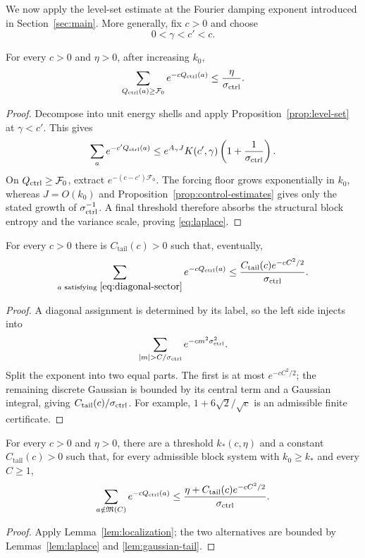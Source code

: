 We now apply the level-set estimate at the Fourier damping exponent introduced
in Section~\ref{sec:main}.  More generally, fix $c>0$ and choose
\begin{equation}\label{eq:gamma-order}
 0<\gamma<c'<c.
\end{equation}

\begin{lemma}\label{lem:laplace}
For every $c>0$ and $\eta>0$, after increasing $k_0$,
\begin{equation}\label{eq:laplace}
 \sum_{Q_{\mathrm{ctrl}}(a)\ge\mathcal F_0}e^{-cQ_{\mathrm{ctrl}}(a)}
 \le\frac\eta{\sigma_{\mathrm{ctrl}}}.
\end{equation}
\end{lemma}
\begin{proof}
Decompose into unit energy shells and apply Proposition~\ref{prop:level-set} at
$\gamma<c'$.  This gives
\[
 \sum_a e^{-c'Q_{\mathrm{ctrl}}(a)}
 \le e^{A_\gamma J}K(c',\gamma)
 \left(1+\frac1{\sigma_{\mathrm{ctrl}}}\right).
\]
On $Q_{\mathrm{ctrl}}\ge\mathcal F_0$, extract
$e^{-(c-c')\mathcal F_0}$.  The forcing floor grows exponentially in $k_0$,
whereas $J=O(k_0)$ and Proposition~\ref{prop:control-estimates} gives only the
stated growth of $\sigma_{\mathrm{ctrl}}^{-1}$.  A final threshold therefore absorbs the
structural block entropy and the variance scale, proving \eqref{eq:laplace}.
\end{proof}

\begin{lemma}\label{lem:gaussian-tail}
For every $c>0$ there is $C_{\mathrm{tail}}(c)>0$ such that, eventually,
\begin{equation}\label{eq:gaussian-tail}
 \sum_{\substack{a\text{ satisfying }\eqref{eq:diagonal-sector}}}
 e^{-cQ_{\mathrm{ctrl}}(a)}
 \le\frac{C_{\mathrm{tail}}(c)e^{-cC^2/2}}{\sigma_{\mathrm{ctrl}}}.
\end{equation}
\end{lemma}
\begin{proof}
A diagonal assignment is determined by its label, so the left side injects into
\[
 \sum_{|m|>C/\sctrl}e^{-cm^2\sctrl^2}.
\]
Split the exponent into two equal parts.  The first is at most $e^{-cC^2/2}$;
the remaining discrete Gaussian is bounded by its central term and a Gaussian
integral, giving $C_{\mathrm{tail}}(c)/\sigma_{\mathrm{ctrl}}$.  For example,
$1+6\sqrt2/\sqrt c$ is an admissible finite certificate.
\end{proof}

\begin{theorem}\label{thm:global-partition}
For every $c>0$ and $\eta>0$, there are a threshold $k_*(c,\eta)$ and a constant
$C_{\mathrm{tail}}(c)>0$ such that, for every admissible block system with
$k_0\ge k_*$ and every $C\ge1$,
\begin{equation}\label{eq:global-partition}
 \sum_{a\notin\mathfrak M(C)}e^{-cQ_{\mathrm{ctrl}}(a)}
 \le\frac{\eta+C_{\mathrm{tail}}(c)e^{-cC^2/2}}{\sigma_{\mathrm{ctrl}}}.
\end{equation}
\end{theorem}
\begin{proof}
Apply Lemma~\ref{lem:localization}; the two alternatives are bounded by
Lemmas~\ref{lem:laplace} and \ref{lem:gaussian-tail}.
\end{proof}

